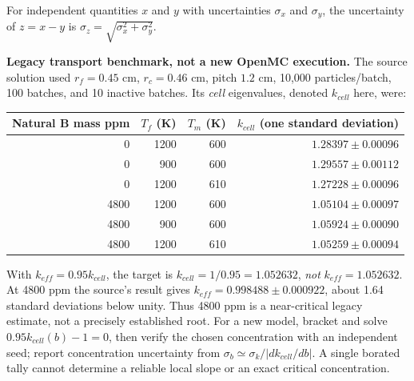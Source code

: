 For independent quantities \(x\) and \(y\) with uncertainties \(\sigma_x\) and \(\sigma_y\), the uncertainty of \(z=x-y\) is \(\sigma_z=\sqrt{\sigma_x^2+\sigma_y^2}\).

\begin{adaptedsolution}

\textbf{Legacy transport benchmark, not a new OpenMC execution.}
The source solution used $r_f=0.45$ cm, $r_c=0.46$ cm, pitch $1.2$ cm,
10,000 particles/batch, 100 batches, and 10 inactive batches. Its
\emph{cell} eigenvalues, denoted $k_{cell}$ here, were:
\begin{center}\begin{tabular}{rrrr}
\toprule
Natural B mass ppm&$T_f$ (K)&$T_m$ (K)&$k_{cell}$ (one standard deviation)\\\midrule
0&1200&600&$1.28397\pm0.00096$\\
0&900&600&$1.29557\pm0.00112$\\
0&1200&610&$1.27228\pm0.00096$\\
4800&1200&600&$1.05104\pm0.00097$\\
4800&900&600&$1.05924\pm0.00090$\\
4800&1200&610&$1.05259\pm0.00094$\\\bottomrule
\end{tabular}\end{center}
With $k_{eff}=0.95k_{cell}$, the target is $k_{cell}=1/0.95=1.052632$,
\emph{not} $k_{eff}=1.052632$. At 4800 ppm the source's result gives
$k_{eff}=0.998488\pm0.000922$, about 1.64 standard deviations below unity.
Thus 4800 ppm is a near-critical legacy estimate, not a precisely established root.
For a new model, bracket and solve $0.95k_{cell}(b)-1=0$, then verify the
chosen concentration with an independent seed; report concentration uncertainty
from $\sigma_b\simeq\sigma_k/|dk_{cell}/db|$. A single borated tally cannot
determine a reliable local slope or an exact critical concentration.


\end{adaptedsolution}
